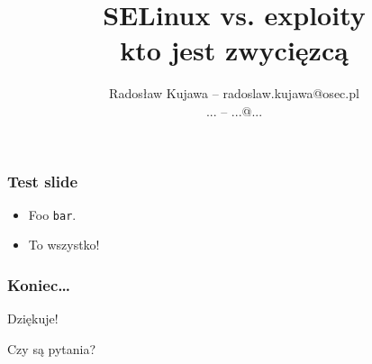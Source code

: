 

\title{SELinux vs. exploity\\ kto jest zwycięzcą}
\author{Radosław Kujawa -- radoslaw.kujawa@osec.pl \\ ... -- ...@...}



\begin{frame}
	\titlepage
\end{frame}

\begin{frame}
\frametitle{Test slide}
\begin{itemize}
	\item Foo {\tt bar}.
	\item To wszystko! \Smiley
\end{itemize}
\end{frame}

\begin{frame}
\frametitle{Koniec\ldots}
\begin{center}

Dziękuje!

Czy są pytania?

\end{center}
\end{frame}



